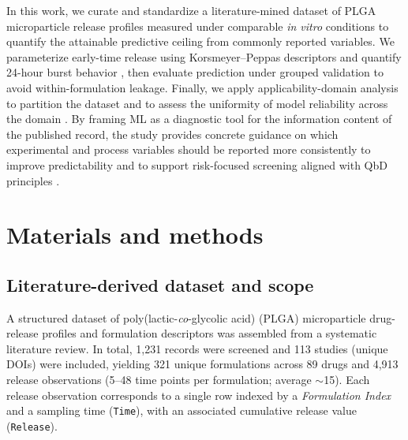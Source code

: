 \documentclass[preprint,12pt,authoryear]{elsarticle}
\begin{document}
In this work, we curate and standardize a literature-mined dataset of PLGA microparticle release profiles measured under comparable \emph{in vitro} conditions to quantify the attainable predictive ceiling from commonly reported variables. We parameterize early-time release using Korsmeyer--Peppas descriptors \citep{Korsmeyer1983,RitgerPeppas1987} and quantify 24-hour burst behavior \citep{Yoo2020Burst}, then evaluate prediction under grouped validation to avoid within-formulation leakage. Finally, we apply applicability-domain analysis to partition the dataset and to assess the uniformity of model reliability across the domain \citep{OECD2004QSAR,WeaverGleeson2008,Netzeva2005AD}. By framing ML as a diagnostic tool for the information content of the published record, the study provides concrete guidance on which experimental and process variables should be reported more consistently to improve predictability and to support risk-focused screening aligned with QbD principles \citep{ICHQ8R2}.

\section{Materials and methods}

\subsection{Literature-derived dataset and scope}
A structured dataset of poly(lactic-\emph{co}-glycolic acid) (PLGA) microparticle drug-release profiles and formulation descriptors was assembled from a systematic literature review. In total, 1{,}231 records were screened and 113 studies (unique DOIs) were included, yielding 321 unique formulations across 89 drugs and 4{,}913 release observations (5--48 time points per formulation; average $\sim$15). Each release observation corresponds to a single row indexed by a \textit{Formulation Index} and a sampling time (\texttt{Time}), with an associated cumulative release value (\texttt{Release}).
\end{document}
